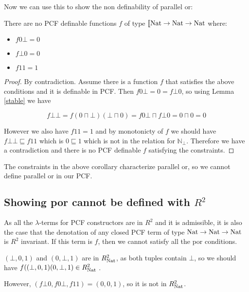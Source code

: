 Now we can use this to show the non definability of parallel or:

\vspace{0.5cm}

\begin{cor}
There are no PCF definable functions $f$ of type $\llbracket \operatorname{Nat} \to \operatorname{Nat} \to \operatorname{Nat}$ where:

\begin{itemize}
\item{$f 0 \bot = 0$}
\item{$f \bot 0 = 0$}
\item{$f 1 1 = 1$}
\end{itemize}
\end{cor}

\begin{proof}
By contradiction. Assume there is a function $f$ that satisfies the above conditions and it is definable in PCF. Then $f 0 \bot = 0 = f \bot 0$, so using Lemma \ref{stable} we have

\[ f \bot \bot = f(0 \sqcap \bot)(\bot \sqcap 0) = f 0 \bot \sqcap f \bot 0 = 0 \sqcap 0 = 0 \]

However we also have $f 1 1 = 1$ and by monotonicty of $f$ we should have $f \bot \bot \sqsubseteq f 1 1$ which is $0 \sqsubseteq 1$ which is not in the relation for $\mathbb{N}_\bot$. Therefore we have a contradiction and there is no PCF definable $f$ satisfying the constraints.
\end{proof}

The constraints in the above corollary characterize parallel or, so we cannot define parallel or in our PCF.

\subsection{Showing por cannot be defined with $R^2$}

As all the $\lambda$-terms for PCF constructors are in $R^2$ and it is admissible, it is also the case that the denotation of any closed PCF term of type $\operatorname{Nat} \to \operatorname{Nat} \to \operatorname{Nat}$ is $R^2$ invariant.  If this term is $f$, then we cannot satisfy all the por conditions.

$(\bot, 0, 1)$ and $(0, \bot, 1)$ are in $R_{\operatorname{Nat}}^2$, as both tuples contain $\bot$, so we should have $f ((\bot, 0, 1)(0, \bot, 1) \in R_{\operatorname{Nat}}^2$ . 

However, $(f \bot 0, f 0 \bot, f 1 1) = (0,0,1)$, so it is not in $R_{\operatorname{Nat}}^2$.